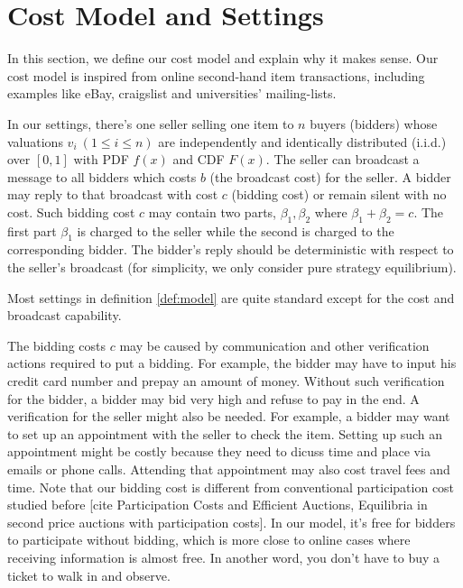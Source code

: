 \section{Cost Model and Settings}

In this section, we define our cost model and explain why it makes sense. Our
cost model is inspired from online second-hand item transactions, including
examples like eBay, craigslist and universities' mailing-lists.


\begin{definition}\label{def:model}

In our settings, there's one seller selling one item to $n$ buyers (bidders)
whose valuations $v_i~(1 \leq i \leq n)$ are independently and identically
distributed (i.i.d.) over $[0, 1]$ with PDF $f(x)$ and CDF $F(x)$. The seller
can broadcast a message to all bidders which costs $b$ (the broadcast cost) for
the seller.  A bidder may reply to that broadcast with cost $c$ (bidding cost)
or remain silent with no cost. Such bidding cost $c$ may contain two parts,
$\beta_1, \beta_2$ where $\beta_1+\beta_2 = c$.  The first part $\beta_1$ is
charged to the seller while the second is charged to the corresponding bidder.
The bidder's reply should be deterministic with respect to the seller's
broadcast (for simplicity, we only consider pure strategy equilibrium).

\end{definition}

Most settings in definition \ref{def:model} are quite standard except for the
cost and broadcast capability.

The bidding costs $c$ may be caused by communication and other verification
actions required to put a bidding. For example, the bidder may have to input
his credit card number and prepay an amount of money. Without such verification
for the bidder, a bidder may bid very high and refuse to pay in the end. A
verification for the seller might also be needed. For example, a bidder may
want to set up an appointment with the seller to check the item.  Setting up
such an appointment might be costly because they need to dicuss time and place
via emails or phone calls.  Attending that appointment may also cost travel
fees and time.  Note that our bidding cost is different from conventional
participation cost studied before [cite Participation Costs and Efficient
Auctions, Equilibria in second price auctions with participation costs]. In our
model, it's free for bidders to participate without bidding, which is more
close to online cases where receiving information is almost free.  In another
word, you don't have to buy a ticket to walk in and observe.


